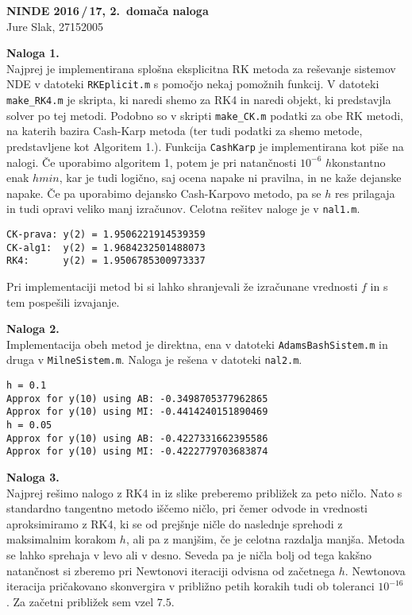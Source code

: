 \documentclass[a4paper,oneside,12pt]{article}
\title{\Title}
\author{\Author}
\date{\today}
\theoremstyle{definition}
\newcommand{\Title}{NINDE 2016\,/\,17, 2.\ domača naloga}
\begin{document}
\begin{center}
  \textbf{\large \Title} \\[12pt]
  Jure Slak, 27152005
\end{center}

\textbf{Naloga 1.} \\
Najprej je implementirana splošna eksplicitna RK metoda za reševanje sistemov
NDE v datoteki \verb|RKEplicit.m| s pomočjo nekaj pomožnih funkcij. V datoteki
\verb|make_RK4.m| je skripta, ki naredi shemo za RK4 in naredi objekt, ki
predstavjla solver po tej metodi. Podobno so v skripti \verb|make_CK.m| podatki
za obe RK metodi, na katerih bazira Cash-Karp metoda (ter tudi podatki za shemo
metode, predstavljene kot Algoritem 1.). Funkcija \verb|CashKarp| je
implementirana kot piše na nalogi. Če uporabimo algoritem 1, potem je pri
natančnosti $10^{-6}$ $h$konstantno enak $hmin$, kar je tudi logično, saj ocena
napake ni pravilna, in ne kaže dejanske napake. Če pa uporabimo dejansko
Cash-Karpovo metodo, pa se $h$ res prilagaja in tudi opravi veliko manj
izračunov. Celotna rešitev naloge je v \verb|nal1.m|.

\begin{verbatim}
CK-prava: y(2) = 1.9506221914539359
CK-alg1:  y(2) = 1.9684232501488073
RK4:      y(2) = 1.9506785300973337
\end{verbatim}

Pri implementaciji metod bi si lahko shranjevali že izračunane vrednosti $f$ in
s tem pospešili izvajanje.

\textbf{Naloga 2.} \\

Implementacija obeh metod je direktna, ena v datoteki
\verb|AdamsBashSistem.m| in druga v \verb|MilneSistem.m|.
Naloga je rešena v datoteki \verb|nal2.m|.

\begin{verbatim}
h = 0.1
Approx for y(10) using AB: -0.3498705377962865
Approx for y(10) using MI: -0.4414240151890469
h = 0.05
Approx for y(10) using AB: -0.4227331662395586
Approx for y(10) using MI: -0.4222779703683874
\end{verbatim}

\textbf{Naloga 3.} \\
Najprej rešimo nalogo z RK4 in iz slike preberemo približek za peto ničlo.
Nato s standardno tangentno metodo iščemo ničlo, pri čemer odvode in vrednosti
aproksimiramo z RK4, ki se od prejšnje ničle do naslednje sprehodi z maksimalnim
korakom $h$, ali pa z manjšim, če je celotna razdalja manjša. Metoda se lahko
sprehaja v levo ali v desno. Seveda pa je ničla bolj od tega kakšno natančnost
si zberemo pri Newtonovi iteraciji odvisna od začetnega $h$. Newtonova iteracija
pričakovano skonvergira v približno petih korakih tudi ob toleranci $10^{-16}$.
Za začetni približek sem vzel $7.5$.
\end{document}
